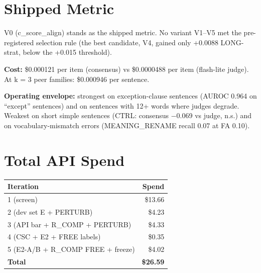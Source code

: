 \documentclass[11pt,letterpaper]{article}
\begin{document}
\section{Shipped Metric}

V0 (c\_score\_align) stands as the shipped metric. No variant V1--V5 met the pre-registered selection rule (the best candidate, V4, gained only +0.0088 LONG-strat, below the +0.015 threshold).

\textbf{Cost:} \$0.000121 per item (consensus) vs \$0.0000488 per item (flash-lite judge). At k = 3 peer families: \$0.000946 per sentence.

\textbf{Operating envelope:} strongest on exception-clause sentences (AUROC 0.964 on ``except'' sentences) and on sentences with 12+ words where judges degrade. Weakest on short simple sentences (CTRL: consensus $-$0.069 vs judge, n.s.) and on vocabulary-mismatch errors (MEANING\_RENAME recall 0.07 at FA 0.10).

\section{Total API Spend}

\begin{center}
\begin{tabular}{lr}
\toprule
Iteration & Spend \\
\midrule
1 (screen) & \$13.66 \\
2 (dev set E + PERTURB) & \$4.23 \\
3 (API bar + R\_COMP + PERTURB) & \$4.33 \\
4 (CSC + E2 + FREE labels) & \$0.35 \\
5 (E2-A/B + R\_COMP FREE + freeze) & \$4.02 \\
\midrule
\textbf{Total} & \textbf{\$26.59} \\
\bottomrule
\end{tabular}
\end{center}
\end{document}
